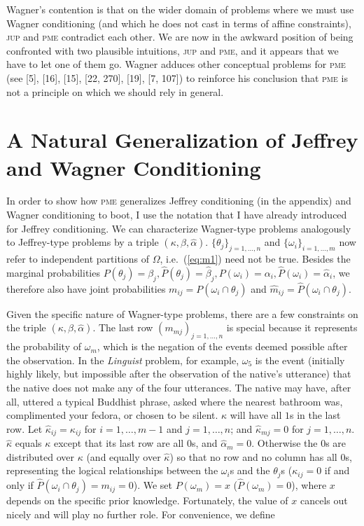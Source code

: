 Wagner's contention is that on the wider domain of problems where we
must use Wagner conditioning (and which he does not cast in terms of
affine constraints), \textsc{jup} and \textsc{pme} contradict each
other. We are now in the awkward position of being confronted with two
plausible intuitions, \textsc{jup} and \textsc{pme}, and it appears
that we have to let one of them go. Wagner adduces other conceptual
problems for \textsc{pme} (see [5], [16], [15], [22, 270], [19],
[7, 107]) to reinforce his conclusion that \textsc{pme} is not a
principle on which we should rely in general.

\section{A Natural Generalization of Jeffrey and Wagner Conditioning}
\label{Generalization}

In order to show how \textsc{pme} generalizes Jeffrey conditioning (in
the appendix) and Wagner conditioning to boot, I use the notation that
I have already introduced for Jeffrey conditioning. We can
characterize Wagner-type problems analogously to Jeffrey-type problems
by a triple $(\kappa,\beta,\hat{\alpha})$.
$\{\theta_{j}\}_{j=1,\ldots,n}$ and $\{\omega_{i}\}_{i=1,\ldots,m}$
now refer to independent partitions of $\Omega$, i.e.\ (\ref{eq:m1})
need not be true. Besides the marginal probabilities
$P(\theta_{j})=\beta_{j}, \hat{P}(\theta_{j})=\hat{\beta}_{j},
P(\omega_{i})=\alpha_{i},\hat{P}(\omega_{i})=\hat{\alpha}_{i}$, we
therefore also have joint probabilities
$m_{ij}=P(\omega_{i}\cap\theta_{j})$ and
$\hat{m}_{ij}=\hat{P}(\omega_{i}\cap\theta_{j})$.

Given the specific nature of Wagner-type problems, there are a few
constraints on the triple $(\kappa,\beta,\hat{\alpha})$. The last row
$(m_{mj})_{j=1,\ldots,n}$ is special because it represents the
probability of $\omega_{m}$, which is the negation of the events
deemed possible after the observation. In the \emph{Linguist} problem,
for example, $\omega_{5}$ is the event (initially highly likely, but
impossible after the observation of the native's utterance) that the
native does not make any of the four utterances. The native may have,
after all, uttered a typical Buddhist phrase, asked where the nearest
bathroom was, complimented your fedora, or chosen to be silent.
$\kappa$ will have all $1$s in the last row. Let
$\hat{\kappa}_{ij}=\kappa_{ij}$ for $i=1,\ldots,m-1$ and
$j=1,\ldots,n$; and $\hat{\kappa}_{mj}=0$ for $j=1,\ldots,n$.
$\hat{\kappa}$ equals $\kappa$ except that its last row are all $0$s,
and $\hat{\alpha}_{m}=0$. Otherwise the $0$s are distributed over
$\kappa$ (and equally over $\hat{\kappa}$) so that no row and no
column has all $0$s, representing the logical relationships between
the $\omega_{i}$s and the $\theta_{j}$s ($\kappa_{ij}=0$ if and only
if $\hat{P}(\omega_{i}\cap\theta_{j})=m_{ij}=0$). We set
$P(\omega_{m})=x$ ($\hat{P}(\omega_{m})=0$), where $x$ depends on the
specific prior knowledge. Fortunately, the value of $x$ cancels out
nicely and will play no further role. For convenience, we define

